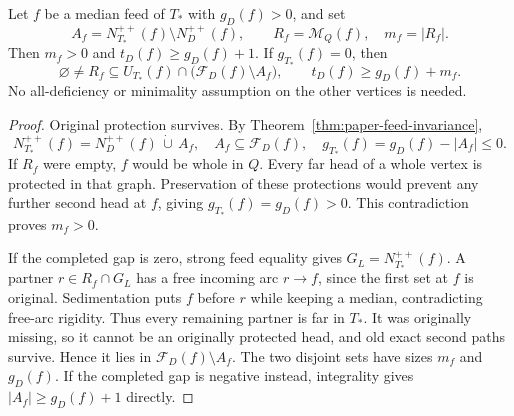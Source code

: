 \begin{theorem}\label{thm:paper-strict-surplus}
Let $f$ be a median feed of $T_*$ with $g_D(f)>0$, and set
\[
 A_f=N_{T_*}^{++}(f)\setminus N_D^{++}(f),\qquad
 R_f=\mathcal M_Q(f),\quad m_f=|R_f|.
\]
Then $m_f>0$ and $t_D(f)\ge g_D(f)+1$.
If $g_{T_*}(f)=0$, then
\[
 \varnothing\ne R_f\subseteq U_{T_*}(f)\cap
       \bigl(\mathcal F_D(f)\setminus A_f\bigr),\qquad
 t_D(f)\ge g_D(f)+m_f.
\]
No all-deficiency or minimality assumption on the other vertices is needed.
\end{theorem}
\begin{proof}
Original protection survives. By Theorem~\ref{thm:paper-feed-invariance},
\[
 N_{T_*}^{++}(f)=N_D^{++}(f)\,\dot\cup\,A_f,
 \quad A_f\subseteq\mathcal F_D(f),\quad
 g_{T_*}(f)=g_D(f)-|A_f|\le0.
\]
If $R_f$ were empty, $f$ would be whole in $Q$. Every far head of a whole
vertex is protected in that graph. Preservation of these protections would
prevent any further second head at $f$, giving $g_{T_*}(f)=g_D(f)>0$.
This contradiction proves $m_f>0$.

If the completed gap is zero, strong feed equality gives
$G_L=N_{T_*}^{++}(f)$. A partner $r\in R_f\cap G_L$ has a free incoming
arc $r\to f$, since the first set at $f$ is original. Sedimentation puts
$f$ before $r$ while keeping a median, contradicting free-arc rigidity.
Thus every remaining partner is far in $T_*$. It was originally missing,
so it cannot be an originally protected head, and old exact second paths
survive. Hence it lies in $\mathcal F_D(f)\setminus A_f$. The two disjoint
sets have sizes $m_f$ and $g_D(f)$. If the completed gap is negative instead,
integrality gives $|A_f|\ge g_D(f)+1$ directly.
\end{proof}

